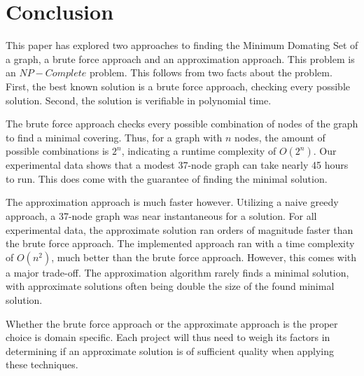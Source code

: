 \documentclass[paper.tex]{subfiles}
\begin{document}
\section{Conclusion}

This paper has explored two approaches to finding the Minimum Domating Set of a graph, a brute force approach and an approximation approach.
This problem is an $NP-Complete$ problem.
This follows from two facts about the problem.
First, the best known solution is a brute force approach, checking every possible solution.
Second, the solution is verifiable in polynomial time.

The brute force approach checks every possible combination of nodes of the graph to find a minimal covering.
Thus, for a graph with $n$ nodes, the amount of possible combinations is $2^n$, indicating a runtime complexity of $O(2^n)$.
Our experimental data shows that a modest 37-node graph can take nearly 45 hours to run.
This does come with the guarantee of finding the minimal solution.

The approximation approach is much faster however. 
Utilizing a naive greedy approach, a 37-node graph was near instantaneous for a solution.
For all experimental data, the approximate solution ran orders of magnitude faster than the brute force approach.
The implemented approach ran with a time complexity of $O(n^2)$, much better than the brute force approach.
However, this comes with a major trade-off. 
The approximation algorithm rarely finds a minimal solution, with approximate solutions often being double the size of the found minimal solution.

Whether the brute force approach or the approximate approach is the proper choice is domain specific.
Each project will thus need to weigh its factors in determining if an approximate solution is of sufficient quality when applying these techniques.
\end{document}
